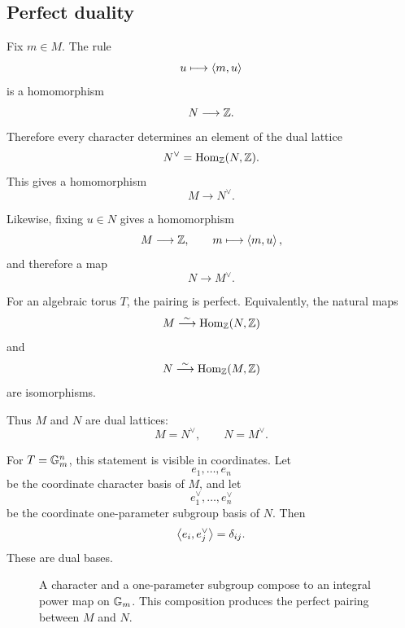 \subsection{Perfect duality}

Fix \(m\in M\). The rule
\[
u\longmapsto\left\langle m,u\right\rangle
\]
is a homomorphism
\[
N\longrightarrow\mathbb{Z}.
\]
Therefore every character determines an element of the dual lattice
\[
N^\vee
=
\operatorname{Hom}_{\mathbb{Z}}(N,\mathbb{Z}).
\]
This gives a homomorphism
\[
M\longrightarrow N^\vee.
\]

Likewise, fixing \(u\in N\) gives a homomorphism
\[
M\longrightarrow\mathbb{Z},
\qquad
m\longmapsto\left\langle m,u\right\rangle,
\]
and therefore a map
\[
N\longrightarrow M^\vee.
\]

\begin{theorem}
\label{thm:character-oneps-duality}
For an algebraic torus \(T\), the pairing is perfect. Equivalently,
the natural maps
\[
M\overset{\sim}{\longrightarrow}
\operatorname{Hom}_{\mathbb{Z}}(N,\mathbb{Z})
\]
and
\[
N\overset{\sim}{\longrightarrow}
\operatorname{Hom}_{\mathbb{Z}}(M,\mathbb{Z})
\]
are isomorphisms.
\end{theorem}

Thus \(M\) and \(N\) are dual lattices:
\[
\boxed{
M=N^\vee,
\qquad
N=M^\vee.
}
\]

For \(T=\mathbb{G}_{m}^n\), this statement is visible in coordinates. Let
\[
e_1,\ldots,e_n
\]
be the coordinate character basis of \(M\), and let
\[
e_1^\vee,\ldots,e_n^\vee
\]
be the coordinate one-parameter subgroup basis of \(N\). Then
\[
\left\langle e_i,e_j^\vee\right\rangle
=
\delta_{ij}.
\]
These are dual bases.

\begin{figure}[ht]
\centering
{}
\caption{A character and a one-parameter subgroup compose to an
integral power map on \(\mathbb{G}_{m}\). This composition produces the perfect
pairing between \(M\) and \(N\).}
\label{fig:character-oneps-pairing}
\end{figure}

